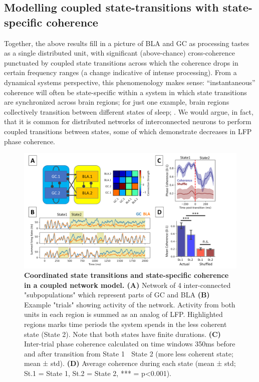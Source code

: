 \begin{refsection}
\subsection{Modelling coupled state-transitions with state-specific coherence}
Together, the above results fill in a picture of BLA and GC as processing tastes as a single distributed unit, with significant (above-chance) cross-coherence punctuated by coupled state transitions across which the coherence drops in certain frequency ranges (a change indicative of intense processing). From a dynamical systems perspective, this phenomenology makes sense: “instantaneous” coherence will often be state-specific within a system in which state transitions are synchronized across brain regions; for just one example, brain regions collectively transition between different states of sleep; \cite{stitt2017a}. We would argue, in fact, that it is common for distributed networks of interconnected neurons to perform coupled transitions between states, some of which demonstrate decreases in LFP phase coherence.

\begin{figure}
\includegraphics[width=\linewidth]{mahmood_22_figures/fig10-0.png}
\caption{\textbf{Coordinated state transitions and state-specific coherence in a coupled network model. (A)} Network of 4 inter-connected "subpopulations" which represent parts of GC and BLA \textbf{(B)} Example "trials" showing activity of the network. Activity from both units in each region is summed as an analog of LFP. Highlighted regions marks time periods the system spends in the less coherent state (State 2). Note that both states have finite durations. \textbf{(C)} Inter-trial phase coherence calculated on time windows 350ms before and after transition from State 1  State 2 (moreless coherent state; mean ± std). \textbf{(D)} Average coherence during each state (mean ± std; St.1 = State 1, St.2 = State 2, *** = p<0.001).}
\label{fig:wrapfig}
\end{figure}


\end{refsection}
